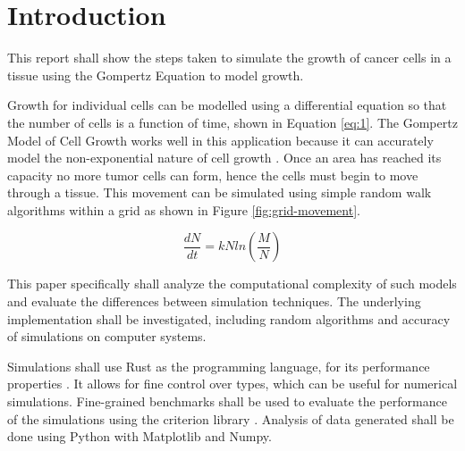 \chapter{Introduction}

This report shall show the steps taken to simulate the growth of cancer cells in a tissue using the Gompertz Equation to model growth.

Growth for individual cells can be modelled using a differential equation so that the number of cells is a function of time, shown in Equation \ref{eq:1}.
The Gompertz Model of Cell Growth works well in this application because it can accurately model the non-exponential nature of cell growth \autocite{tatroMathematicsCancerFitting2018}.
Once an area has reached its capacity no more tumor cells can form, hence the cells must begin to move through a tissue.
This movement can be simulated using simple random walk algorithms within a grid \autocite{codlingRandomWalkModels2008} as shown in Figure \ref{fig:grid-movement}.

\begin{equation}
    \frac{dN}{dt} = kNln\left(\frac{M}{N} \right) \label{eq:1}
\end{equation}

This paper specifically shall analyze the computational complexity of such models and evaluate the differences between simulation techniques.
The underlying implementation shall be investigated, including random algorithms and accuracy of simulations on computer systems.

Simulations shall use Rust as the programming language, for its performance properties \autocite{adamRustConciseOverview2023}.
It allows for fine control over types, which can be useful for numerical simulations.
Fine-grained benchmarks shall be used to evaluate the performance of the simulations using the criterion library \autocite{heislerBheislerCriterionRs2024}.
Analysis of data generated shall be done using Python with Matplotlib and Numpy.




